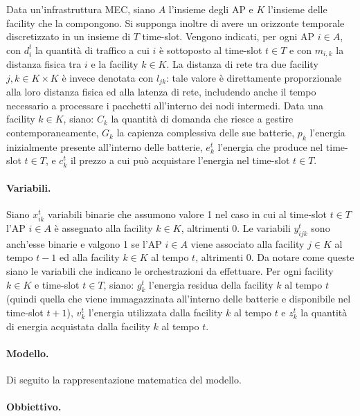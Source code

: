 Data un'infrastruttura MEC, siano $A$ l'insieme degli AP e $K$ l'insieme delle facility che la compongono. Si supponga inoltre di avere un orizzonte temporale discretizzato in un insieme di $T$ time-slot. Vengono indicati, per ogni AP $i \in A$, con $d^t_i$ la quantità di traffico a cui $i$ è sottoposto al time-slot $t \in T$ e con $m_{i,k}$ la distanza fisica tra $i$ e la facility $k \in K$. La distanza di rete tra due facility $j, k \in K \times K$ è invece denotata con $l_{jk}$: tale valore è direttamente proporzionale alla loro distanza fisica ed alla latenza di rete, includendo anche il tempo necessario a processare i pacchetti all'interno dei nodi intermedi. Data una facility $k \in K$, siano: $C_k$ la quantità di domanda che riesce a gestire contemporaneamente, $G_k$ la capienza complessiva delle sue batterie, $p_k$ l'energia inizialmente presente all'interno delle batterie, $e^t_k$ l'energia che produce nel time-slot $t \in T$, e $c^t_k$ il prezzo a cui può acquistare l'energia nel time-slot $t \in T$.

\paragraph*{Variabili.}

Siano $x^t_{ik}$ variabili binarie che assumono valore 1 nel caso in cui al time-slot $t \in T$ l'AP $i \in A$ è assegnato alla facility $k \in K$, altrimenti 0. Le variabili $y^t_{ijk}$ sono anch'esse binarie e valgono 1 se l'AP $i \in A$ viene associato alla facility $j \in K$ al tempo $t - 1$ ed alla facility $k \in K$ al tempo $t$, altrimenti 0. Da notare come queste siano le variabili che indicano le orchestrazioni da effettuare. Per ogni facility $k \in K$ e time-slot $t \in T$, siano: $g^t_k$ l'energia residua della facility $k$ al tempo $t$ (quindi quella che viene immagazzinata all'interno delle batterie e disponibile nel time-slot $t+1$), $v^t_k$ l'energia utilizzata dalla facility $k$ al tempo $t$ e $z^t_k$ la quantità di energia acquistata dalla facility $k$ al tempo $t$.

\paragraph*{Modello.}

Di seguito la rappresentazione matematica del modello.



\paragraph*{Obbiettivo.}

